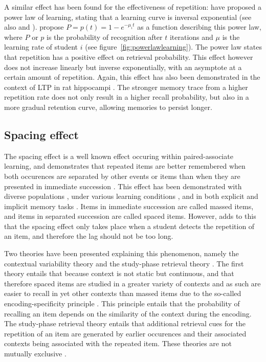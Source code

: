 A similar effect has been found for the effectiveness of repetition:  have proposed a power law of learning, stating that a learning curve is inversal exponential (see also  and ).  propose $P = p(t) = 1-e^{-\mu_{i}t}$ as a function describing this power law, where $P$ or $p$ is the probability of recognition after $t$ iterations and $\mu$ is the learning rate of student $i$ (see figure~\ref{fig:powerlawlearning}). The power law states that repetition has a positive effect on retrieval probability. This effect however does not increase linearly but inverse exponentially, with an asymptote at a certain amount of repetition. Again, this effect has also been demonstrated in the context of LTP in rat hippocampi \cite{barnes}. The stronger memory trace from a higher repetition rate does not only result in a higher recall probability, but also in a more gradual retention curve, allowing memories to persist longer.

\subsection{Spacing effect}

\label{subsec:spacingeffect}

The spacing effect is a well known effect occuring within paired-associate learning, and demonstrates that repeated items are better remembered when both occurences are separated by other events or items than when they are presented in immediate succession \cite{verkoeijen, logan, siegel, xue, karpicke2}. This effect has been demonstrated with diverse populations \cite{verkoeijen, logan}, under various learning conditions \cite{verkoeijen, logan}, and in both explicit and implicit memory tasks \cite{verkoeijen}. Items in immediate succession are called massed items, and items in separated succession are called spaced items. However,  adds to this that the spacing effect only takes place when a student detects the repetition of an item, and therefore the lag should not be too long.

Two theories have been presented explaining this phenomenon, namely the contextual variability theory and the study-phase retrieval theory \cite{siegel}. The first theory entails that because context is not static but continuous, and that therefore spaced items are studied in a greater variety of contexts and as such are easier to recall in yet other contexts than massed items due to the so-called encoding-specificity principle \cite{cognitivepsychology}. This principle entails that the probability of recalling an item depends on the similarity of the context during the encoding. The study-phase retrieval theory entails that additional retrieval cues for the repetition of an item are generated by earlier occurences and their associated contexts being associated with the repeated item. These theories are not mutually exclusive \cite{siegel}.

